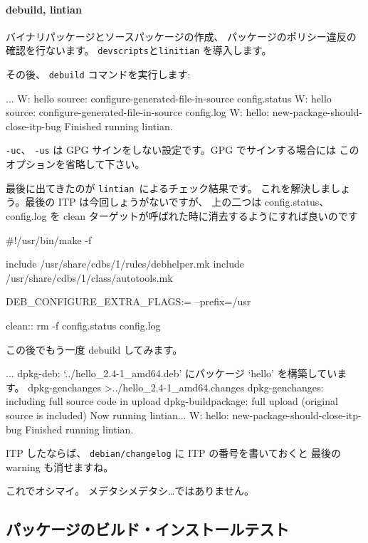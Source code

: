 \documentclass[mingoth,a4paper]{jsarticle}
\begin{document}
\paragraph{debuild, lintian}

バイナリパッケージとソースパッケージの作成、 
パッケージのポリシー違反の確認を行ないます。
{\tt devscripts}と{\tt linitian} を導入します。
\begin{commandline}
\end{commandline}
その後、 {\tt debuild} コマンドを実行します:
\begin{commandline}
...
W: hello source: configure-generated-file-in-source config.status
W: hello source: configure-generated-file-in-source config.log
W: hello: new-package-should-close-itp-bug
Finished running lintian.
\end{commandline}
{\tt -uc}、 {\tt -us} は GPG サインをしない設定です。GPG でサインする場合には
このオプションを省略して下さい。

最後に出てきたのが {\tt lintian }によるチェック結果です。
これを解決しましょう。最後の ITP は今回しょうがないですが、
上の二つは config.status、 config.log を 
clean ターゲットが呼ばれた時に消去するようにすれば良いのです
\begin{commandline}
#!/usr/bin/make -f

include /usr/share/cdbs/1/rules/debhelper.mk
include /usr/share/cdbs/1/class/autotools.mk

DEB_CONFIGURE_EXTRA_FLAGS:= --prefix=/usr

clean::
	rm -f config.status config.log
\end{commandline}
この後でもう一度 debuild してみます。
\begin{commandline}
...
dpkg-deb: `../hello_2.4-1_amd64.deb' にパッケージ `hello' を構築しています。
 dpkg-genchanges  >../hello_2.4-1_amd64.changes
dpkg-genchanges: including full source code in upload
dpkg-buildpackage: full upload (original source is included)
Now running lintian...
W: hello: new-package-should-close-itp-bug
Finished running lintian.
\end{commandline}
ITP したならば、 {\tt debian/changelog} に ITP の番号を書いておくと
最後の warning も消せますね。


これでオシマイ。 メデタシメデタシ…ではありません。

\subsection{パッケージのビルド・インストールテスト}
\end{document}
